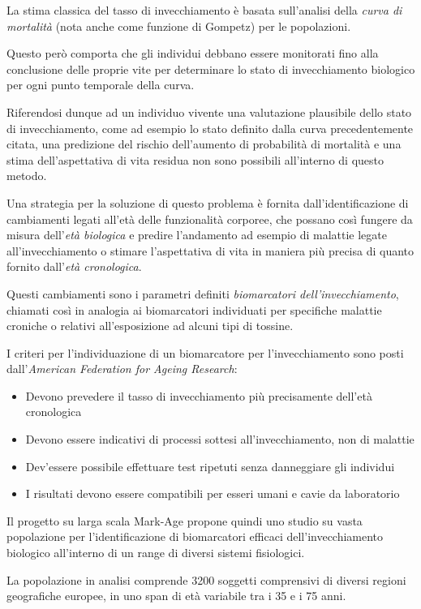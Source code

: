\documentclass[12pt,openright,twoside,a4paper]{book}
\begin{document}
La stima classica del tasso di invecchiamento è basata sull'analisi della \textit{curva di mortalità} (nota anche come funzione di Gompetz) per le popolazioni.

Questo però comporta che gli individui debbano essere monitorati fino alla conclusione delle proprie vite per determinare lo stato di invecchiamento biologico per ogni punto temporale della curva.

Riferendosi dunque ad un individuo vivente una valutazione plausibile dello stato di invecchiamento, come ad esempio lo stato definito dalla curva precedentemente citata, una predizione del rischio dell'aumento di probabilità di mortalità e una stima dell'aspettativa di vita residua non sono possibili all'interno di questo metodo.

Una strategia per la soluzione di questo problema è fornita dall'identificazione di cambiamenti legati all'età delle funzionalità corporee, che possano così fungere da misura dell'\textit{età biologica} e predire l'andamento ad esempio di malattie legate all'invecchiamento o stimare l'aspettativa di vita in maniera più precisa di quanto fornito dall'\textit{età cronologica}.

Questi cambiamenti sono i parametri definiti \textit{biomarcatori dell'invecchiamento}, chiamati così in analogia ai biomarcatori individuati per specifiche malattie croniche o relativi all'esposizione ad alcuni tipi di tossine.

I criteri per l'individuazione di un biomarcatore per l'invecchiamento sono posti dall'\textit{American Federation for Ageing Research}:
\begin{itemize}
\item Devono prevedere il tasso di invecchiamento più precisamente dell'età cronologica
\item Devono essere indicativi di processi sottesi all'invecchiamento, non di malattie
\item Dev'essere possibile effettuare test ripetuti senza danneggiare gli individui
\item I risultati devono essere compatibili per esseri umani e cavie da laboratorio
\end{itemize}

Il progetto su larga scala Mark-Age propone quindi uno studio su vasta popolazione per l'identificazione di biomarcatori efficaci dell'invecchiamento biologico all'interno di un range di diversi sistemi fisiologici.

La popolazione in analisi comprende 3200 soggetti comprensivi di diversi regioni geografiche europee, in uno span di età variabile tra i 35 e i 75 anni.
\end{document}
